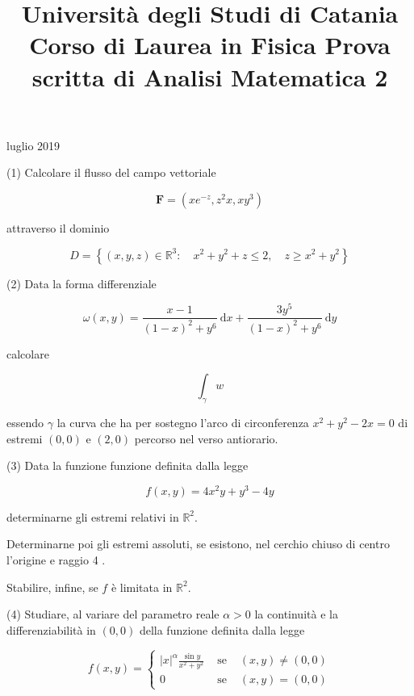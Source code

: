 \documentclass[10pt]{article}
\title{Università degli Studi di Catania 
 Corso di Laurea in Fisica 
 Prova scritta di Analisi Matematica 2 }
\author{}
\date{}
\begin{document}
 luglio 2019

(1) Calcolare il flusso del campo vettoriale

\[
\mathbf{F}=\left(x e^{-z}, z^{2} x, x y^{3}\right)
\]

attraverso il dominio

\[
D=\left\{(x, y, z) \in \mathbb{R}^{3}: \quad x^{2}+y^{2}+z \leq 2, \quad z \geq x^{2}+y^{2}\right\}
\]

(2) Data la forma differenziale

\[
\omega(x, y)=\frac{x-1}{(1-x)^{2}+y^{6}} \mathrm{~d} x+\frac{3 y^{5}}{(1-x)^{2}+y^{6}} \mathrm{~d} y
\]

calcolare

\[
\int_{\gamma} w
\]

essendo \(\gamma\) la curva che ha per sostegno l'arco di circonferenza \(x^{2}+y^{2}-2 x=0\) di estremi \((0,0)\) e \((2,0)\) percorso nel verso antiorario.

(3) Data la funzione funzione definita dalla legge

\[
f(x, y)=4 x^{2} y+y^{3}-4 y
\]

determinarne gli estremi relativi in \(\mathbb{R}^{2}\).

Determinarne poi gli estremi assoluti, se esistono, nel cerchio chiuso di centro l'origine e raggio 4 .

Stabilire, infine, se \(f\) è limitata in \(\mathbb{R}^{2}\).

(4) Studiare, al variare del parametro reale \(\alpha>0\) la continuità e la differenziabilità in \((0,0)\) della funzione definita dalla legge

\[
f(x, y)=\left\{\begin{array}{lll}
|x|^{\alpha} \frac{\sin y}{x^{2}+y^{2}} & \text { se } & (x, y) \neq(0,0) \\
0 & \text { se } & (x, y)=(0,0)
\end{array}\right.
\]
\end{document}
